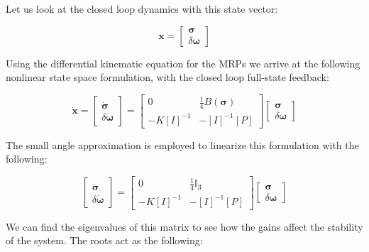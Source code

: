 \documentclass[paper]{aiaaNew}
\begin{document}
Let us look at the closed loop dynamics with this state vector: 

\begin{equation}
\boldsymbol{x}= \begin{bmatrix}{\boldsymbol{\sigma}} \\ {\delta \boldsymbol{\omega}}\end{bmatrix}
\end{equation}

Using the differential kinematic equation for the MRPs we arrive at the following nonlinear state space formulation, with the closed loop full-state feedback: 


\begin{equation}
\dot{\boldsymbol{x}}= \begin{bmatrix}{\dot{\boldsymbol{\sigma}}} \\ {\delta \dot{\boldsymbol{\omega}}}\end{bmatrix} =\left[ \begin{array}{cc}{0} & {\frac{1}{4} B(\boldsymbol{\sigma})} \\ {-K[I]^{-1}} & {-[I]^{-1}[P]}\end{array}\right] \begin{bmatrix}{\boldsymbol{\sigma}} \\ {\delta \boldsymbol{\omega}}\end{bmatrix}
\end{equation}

The small angle approximation is employed to linearize this formulation with the following:

\begin{equation}
\begin{bmatrix}{\dot{\boldsymbol{\sigma}}} \\ {\delta \dot{\boldsymbol{\omega}}}\end{bmatrix} =\left[ \begin{array}{cc}{0} & {\frac{1}{4} \mathbb{I}_3 } \\ {-K[I]^{-1}} & {-[I]^{-1}[P]}\end{array}\right] \begin{bmatrix}{\boldsymbol{\sigma}} \\ {\delta \boldsymbol{\omega}}\end{bmatrix}
\end{equation}

We can find the eigenvalues of this matrix to see how the gains affect the stability of the system. The roots act as the following:
\end{document}
